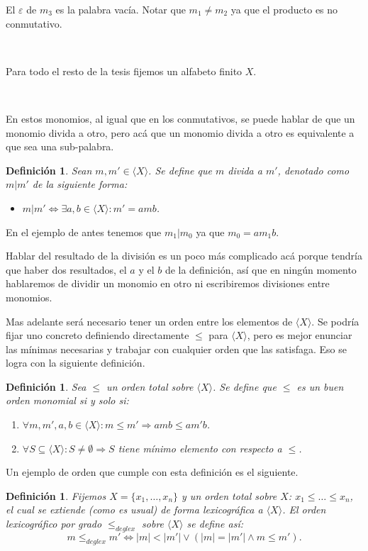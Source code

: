 \documentclass[12pt]{report}
\theoremstyle{customstyle}
\newtheorem{definition}[theorem]{Definición}
\theoremstyle{factstyle}
\begin{document}
El $ε$ de $m_3$ es la palabra vacía. Notar que $m_1 ≠ m_2$ ya que el producto es no conmutativo.

\

Para todo el resto de la tesis fijemos un alfabeto finito $X$.

\

En estos monomios, al igual que en los conmutativos, se puede hablar de que un monomio divida a otro, pero acá que un monomio divida a otro es equivalente a que sea una sub-palabra.

\begin{definition}
  Sean $m, m' ∈ ⟨X⟩$. Se define que $m$ divida a $m'$, denotado como $m | m'$ de la siguiente forma:
  \begin{itemize}
    \item $m | m' ⇔ ∃a , b ∈ ⟨X⟩ : m' = a m b$.
  \end{itemize}
\end{definition}

En el ejemplo de antes tenemos que $m_1 | m_0$ ya que $m_0 = a m_1 b$.

Hablar del resultado de la división es un poco más complicado acá porque tendría que haber dos resultados, el $a$ y el $b$ de la definición, así que en ningún momento hablaremos de dividir un monomio en otro ni escribiremos divisiones entre monomios.

Mas adelante será necesario tener un orden entre los elementos de $⟨X⟩$. Se podría fijar uno concreto definiendo directamente $≤$ para $⟨X⟩$, pero es mejor enunciar las mínimas necesarias y trabajar con cualquier orden que las satisfaga. Eso se logra con la siguiente definición.

\begin{definition}\label{def:buen orden monomial}
  Sea $≤$ un orden total sobre $⟨X⟩$. Se define que $≤$ es un buen orden monomial si y solo si:
  \begin{enumerate}
    \item $∀m, m', a, b ∈ ⟨X⟩ : m ≤ m' ⇒ a m b ≤ a m' b$.
    \item $∀S ⊆ ⟨X⟩ : S ≠ ∅ ⇒ S$ tiene mínimo elemento con respecto a $≤$.
  \end{enumerate}
\end{definition}

Un ejemplo de orden que cumple con esta definición es el siguiente.

\begin{definition}
  Fijemos $X = \{x_1, …, x_n\}$ y un orden total sobre $X$: $x_1 ≤ … ≤ x_n$, el cual se extiende (como es usual) de forma lexicográfica a $⟨X⟩$. El orden lexicográfico por grado $ ≤_{deglex}$ sobre $⟨X⟩$ se define así:
  \[ m ≤_{deglex} m' ⇔ |m| < |m'| ∨ (|m| = |m'| ∧ m ≤ m') \text{.}\]
\end{definition}
\end{document}
